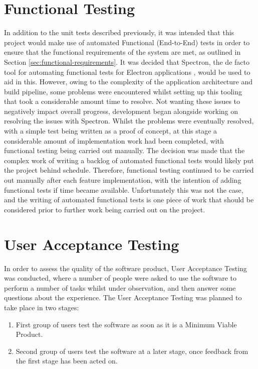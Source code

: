 \section{Functional Testing}
In addition to the unit tests described previously, it was intended that this project would make use of automated Functional (End-to-End) tests in order to ensure that the functional requirements of the system are met, as outlined in Section \ref{sec:functional-requirements}. It was decided that Spectron, the de facto tool for automating functional tests for Electron applications \cite{spectron}, would be used to aid in this. However, owing to the complexity of the application architecture and build pipeline, some problems were encountered whilst setting up this tooling that took a considerable amount time to resolve. Not wanting these issues to negatively impact overall progress, development began alongside working on resolving the issues with Spectron. Whilst the problems were eventually resolved, with a simple test being written as a proof of concept, at this stage a considerable amount of implementation work had been completed, with functional testing being carried out manually. The decision was made that the complex work of writing a backlog of automated functional tests would likely put the project behind schedule. Therefore, functional testing continued to be carried out manually after each feature implementation, with the intention of adding functional tests if time became available. Unfortunately this was not the case, and the writing of automated functional tests is one piece of work that should be considered prior to further work being carried out on the project.


\section{User Acceptance Testing}
In order to assess the quality of the software product, User Acceptance Testing was conducted, where a number of people were asked to use the software to perform a number of tasks whilst under observation, and then answer some questions about the experience. The User Acceptance Testing was planned to take place in two stages:

\begin{enumerate}
  \item First group of users test the software as soon as it is a Minimum Viable Product.
  \item Second group of users test the software at a later stage, once feedback from the first stage has been acted on.
\end{enumerate}

